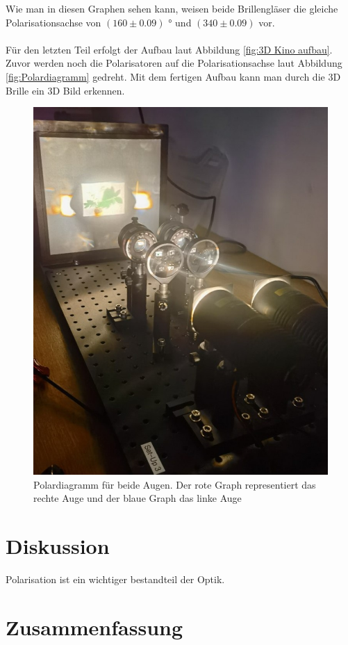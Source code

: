 \documentclass[12pt,a4paper,twoside]{article}
\begin{document}
\noindent
Wie man in diesen Graphen sehen kann, weisen beide Brillengläser die gleiche Polarisationsachse von $(160 \pm 0.09)$ ° und $(340 \pm 0.09)$ vor. 
\\
\\
Für den letzten Teil erfolgt der Aufbau laut Abbildung \ref{fig:3D Kino aufbau}. 
Zuvor werden noch die Polarisatoren auf die Polarisationsachse laut Abbildung \ref{fig:Polardiagramm} gedreht. 
Mit dem fertigen Aufbau kann man durch die 3D Brille ein 3D Bild erkennen. 

\begin{figure}[H]
    \centering
    \includegraphics[width=0.6\linewidth]{nudes/3d kino aufbau.jpg}
    \caption{Polardiagramm für beide Augen. Der rote Graph representiert das rechte Auge und der blaue Graph das linke Auge}
    \label{fig:3D Projektion}
\end{figure}



\section{Diskussion} %
Polarisation ist ein wichtiger bestandteil der Optik. 

\section{Zusammenfassung} %



\printbibliography[heading=bibintoc]
\end{document}
